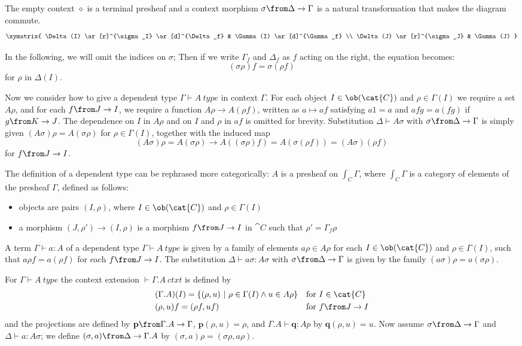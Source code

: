 The empty context $\diamond$ is a terminal presheaf and a context morphism
$\sigma \from \Delta \to \Gamma$ is a natural transformation that makes the
diagram commute.
\[
  \xymatrix{
    \Delta(I) \ar[r]^{\sigma_I} \ar[d]^{\Delta_f} & \Gamma(I) \ar[d]^{\Gamma_f} \\
    \Delta(J) \ar[r]^{\sigma_J} & \Gamma(J)
  }
\]

In the following, we will omit the indices on $\sigma$; Then if we write
$\Gamma_f$ and $\Delta_f$ as $f$ acting on the right, the equation becomes:
\[
  (\sigma \rho) f = \sigma (\rho f)
\]
for $\rho$ in $\Delta(I)$.

Now we consider how to give a dependent type $\Gamma \vdash A~type$ in context
$\Gamma$. For each object $I \in \ob(\cat{C})$ and $\rho \in \Gamma(I)$ we require a
set $A \rho$, and for each $f \from J \to I$, we require a function $A \rho \to
A (\rho f)$, written as $a \mapsto af$ satisfying $a1 = a$ and $afg = a (f g)$
if $g \from K \to J$. The dependence on $I$ in $A\rho$ and on $I$ and $\rho$ in
$af$ is omitted for brevity. Substitution $\Delta \vdash A \sigma$ with $\sigma
\from \Delta \to \Gamma$ is simply given $(A \sigma) \rho = A (\sigma \rho)$
for $\rho \in \Gamma(I)$, together with the induced map
\[
  (A\sigma)\rho = A (\sigma \rho) \to A ((\sigma \rho)f) = A (\sigma (\rho f)) = (A \sigma) (\rho f)
\]
for $f \from J \to I$.

The definition of a dependent type can be rephrased more categorically: $A$ is
a presheaf on $\int_C \Gamma$, where $\int_C \Gamma$ is a category of elements
of the presheaf $\Gamma$, defined as follows:
\begin{itemize}
  \item objects are pairs $(I, \rho)$, where $I \in \ob(\cat{C})$ and $\rho \in
    \Gamma(I)$
  \item a morphism $(J, \rho') \to (I, \rho)$ is a morphism $f \from J \to I$
    in $\cat{C}$ such that $\rho' = \Gamma_f \rho$
\end{itemize}

A term $\Gamma \vdash a : A$ of a dependent type $\Gamma \vdash A~type$ is
given by a family of elements $a \rho \in A \rho$ for each $I \in \ob(\cat{C})$
and $\rho \in \Gamma(I)$, such that $a \rho f = a (\rho f)$ for each $f \from J
\to I$. The substitution $\Delta \vdash a \sigma : A \sigma$ with $\sigma \from
\Delta \to \Gamma$ is given by the family $(a \sigma) \rho = a (\sigma \rho)$.

For $\Gamma \vdash A~type$ the context extension $\vdash \Gamma.A~ctxt$ is
defined by
\begin{align*}
  &(\Gamma.A)(I) = \{(\rho, u)~|~\rho \in \Gamma(I) \land u \in A \rho\} &&
  \text{for $I \in \cat{C}$}\\
  &(\rho, u)f = (\rho f, u f) && \text{for $f \from J \to I$}
\end{align*}
and the projections are defined by $\mathbf{p} \from \Gamma.A \to \Gamma$,
$\mathbf{p}(\rho, u) = \rho$, and $\Gamma.A \vdash \mathbf{q} : Ap$ by
$\mathbf{q}(\rho, u) = u$.  Now assume $\sigma \from \Delta \to \Gamma$ and
$\Delta \vdash a : A\sigma$; we define $(\sigma, a) \from \Delta \to \Gamma.A$
by $(\sigma, a)\rho = (\sigma \rho, a \rho)$.

